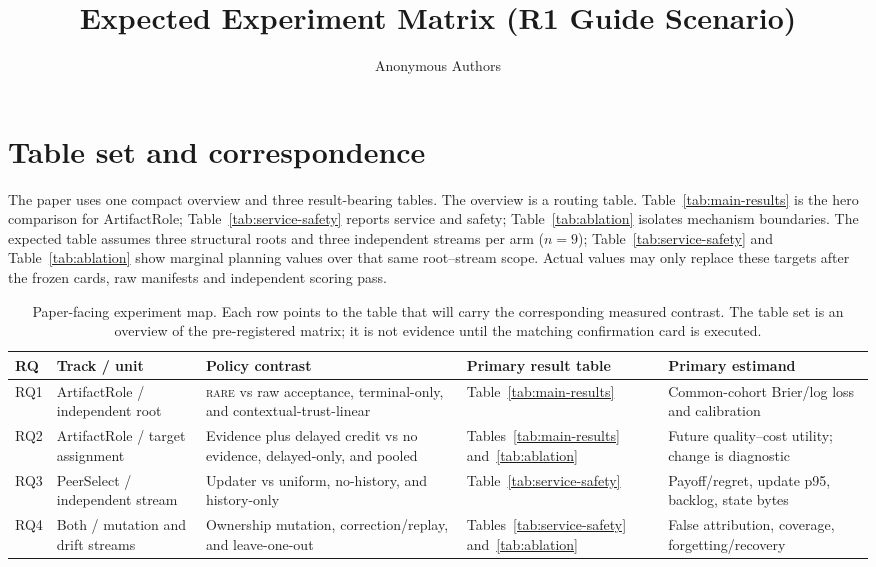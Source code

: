 \documentclass[sigconf,anonymous]{aamas}
\title[Expected Experiment Matrix]{Expected Experiment Matrix (R1 Guide Scenario)}
\author{Anonymous Authors}
\affiliation{\institution{Internal research draft}}
\newcommand{\rare}{\textsc{rare}}
\begin{document}
\maketitle

\section{Table set and correspondence}

The paper uses one compact overview and three result-bearing tables. The overview is a routing table. Table~\ref{tab:main-results} is the hero comparison for ArtifactRole; Table~\ref{tab:service-safety} reports service and safety; Table~\ref{tab:ablation} isolates mechanism boundaries. The expected table assumes three structural roots and three independent streams per arm ($n=9$); Table~\ref{tab:service-safety} and Table~\ref{tab:ablation} show marginal planning values over that same root--stream scope. Actual values may only replace these targets after the frozen cards, raw manifests and independent scoring pass.

\begin{table}[t]
\centering
\small
\setlength{\tabcolsep}{3.5pt}
\renewcommand{\arraystretch}{1.12}
\begin{tabular}{p{}p{}p{}p{}p{}}
\toprule
RQ & Track / unit & Policy contrast & Primary result table & Primary estimand\\
\midrule
RQ1 & ArtifactRole / independent root & \rare{} vs raw acceptance, terminal-only, and contextual-trust-linear & Table~\ref{tab:main-results} & Common-cohort Brier/log loss and calibration\\
RQ2 & ArtifactRole / target assignment & Evidence plus delayed credit vs no evidence, delayed-only, and pooled & Tables~\ref{tab:main-results} and~\ref{tab:ablation} & Future quality--cost utility; change is diagnostic\\
RQ3 & PeerSelect / independent stream & Updater vs uniform, no-history, and history-only & Table~\ref{tab:service-safety} & Payoff/regret, update p95, backlog, state bytes\\
RQ4 & Both / mutation and drift streams & Ownership mutation, correction/replay, and leave-one-out & Tables~\ref{tab:service-safety} and~\ref{tab:ablation} & False attribution, coverage, forgetting/recovery\\
\bottomrule
\end{tabular}
\caption{Paper-facing experiment map. Each row points to the table that will carry the corresponding measured contrast. The table set is an overview of the pre-registered matrix; it is not evidence until the matching confirmation card is executed.}
\label{tab:overview}
\end{table}
\end{document}
